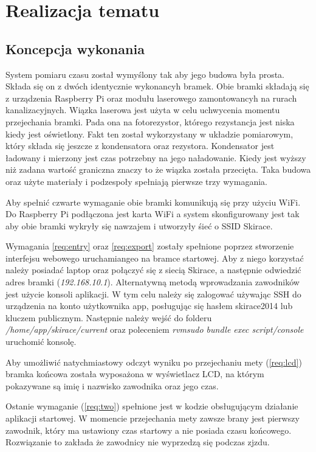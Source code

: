 \documentclass[11pt,a4paper, twoside]{article}
\begin{document}
\section{Realizacja tematu}
\subsection{Koncepcja wykonania}\label{concept}
System pomiaru czasu został wymyślony tak aby jego budowa była prosta. Składa się on z dwóch identycznie wykonancyh bramek. Obie bramki składają się z urządzenia Raspberry Pi oraz modułu laserowego zamontowancyh na rurach kanalizacyjnych. Wiązka laserowa jest użyta w celu uchwycenia momentu przejechania bramki. Pada ona na fotorezystor, którego rezystancja jest niska kiedy jest oświetlony. Fakt ten został wykorzystany w układzie pomiarowym, który składa się jeszcze z kondensatora oraz rezystora. Kondensator jest ładowany i mierzony jest czas potrzebny na jego naładowanie. Kiedy jest wyższy niż zadana wartość graniczna znaczy to że wiązka została przecięta. Taka budowa oraz użyte materiały i podzespoły spełniają pierwsze trzy wymagania.

Aby spełnić czwarte wymaganie obie bramki komunikują się przy użyciu WiFi. Do Raspberry Pi podłączona jest karta WiFi a system skonfigurowany jest tak aby obie bramki wykryły się nawzajem i utworzyły śieć o SSID Skirace.

Wymagania \ref{req:entry} oraz \ref{req:export} zostały spełnione poprzez stworzenie interfejsu webowego uruchamiangeo na bramce startowej. Aby z niego korzystać należy posiadać laptop oraz połączyć się z siecią Skirace, a następnie odwiedzić adres bramki (\emph{192.168.10.1}). Alternatywną metodą wprowadzania zawodników jest użycie konsoli aplikacji. W tym celu należy się zalogować używając SSH do urządzenia na konto użytkownika app, posługując się hasłem skirace2014 lub kluczem publicznym. Następnie należy wejść do folderu \emph{/home/app/skirace/current} oraz poleceniem \emph{rvmsudo bundle exec script/console} uruchomić konsolę. 

Aby umożliwić natychmiastowy odczyt wyniku po przejechaniu mety (\ref{req:lcd}) bramka końcowa została wyposażona w wyświetlacz LCD, na którym pokazywane są imię i nazwisko zawodnika oraz jego czas. 

Ostanie wymaganie (\ref{req:two}) spełnione jest w kodzie obsługującym działanie aplikacji startowej. W momencie przejechania mety zawsze brany jest pierwszy zawodnik, który ma ustawiony czas startowy a nie posiada czasu końcowego. Rozwiązanie to zakłada że zawodnicy nie wyprzedzą się podczas zjzdu.
\end{document}
